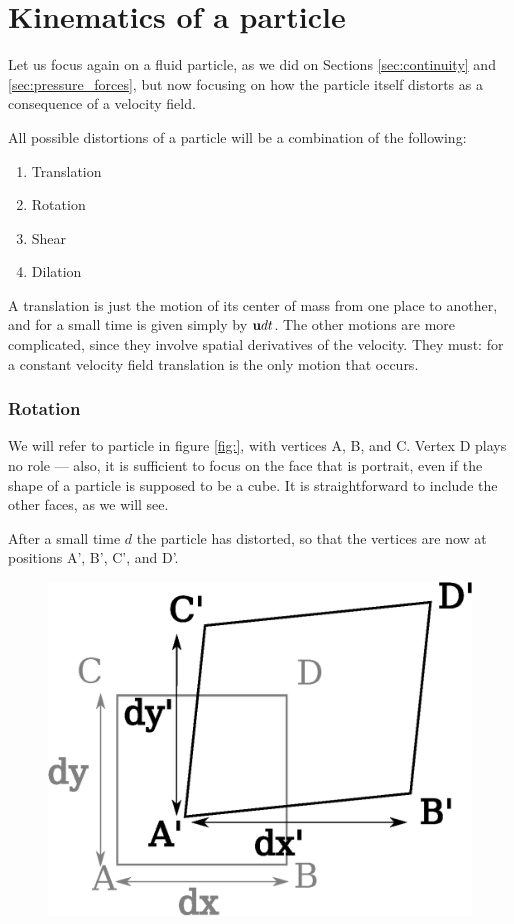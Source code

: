 \section{Kinematics of a particle}

\label{sec:particle}

Let us focus again on a fluid particle, as we did on Sections
\ref{sec:continuity} and \ref{sec:pressure_forces}, but now focusing
on how the particle itself distorts as a consequence of a velocity
field.

All possible distortions of a particle will be a combination of the
following:
\begin{enumerate}
 \item Translation
 \item Rotation
 \item Shear
 \item Dilation
\end{enumerate}

A translation is just the motion of its center of mass from one place
to another, and for a small time is given simply by $\mathbf{u} dt$. The
other motions are more complicated, since they involve spatial
derivatives of the velocity. They must: for a constant velocity field
translation is the only motion that occurs.

\subsubsection{Rotation}

We will refer to particle in figure \ref{fig:}, with vertices A, B,
and C. Vertex D plays no role --- also, it is sufficient to focus on
the face that is portrait, even if the shape of a particle is supposed
to be a cube. It is straightforward to include the other faces, as we
will see.

After a small time $d$ the particle has distorted, so that the
vertices are now at positions A', B', C', and D'.

\begin{figure}
  \centering
  \includegraphics[width=0.4\linewidth]{figures/particle0}
  \caption{\label{fig:particle0}}
\end{figure}



